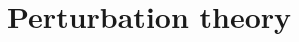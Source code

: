 \documentclass[
twoside,
openright,
titlepage,
numbers=noenddot,
headinclude,
fleqn,
a4paper,
footinclude=true,
cleardoublepage=empty,
abstractoff,
BCOR=5mm,
paper=a4,
fontsize=11pt,
british,ngerman,american,
]{scrreprt}
\begin{document}



\section{Perturbation theory}
\label{sec:perturbation-theory}
\end{document}
